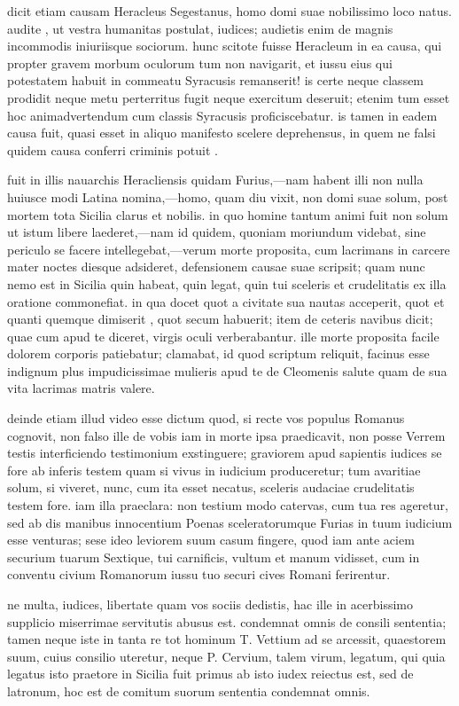  dicit etiam causam Heracleus Segestanus, homo domi suae nobilissimo loco natus. audite , ut vestra humanitas postulat, iudices; audietis enim de magnis incommodis iniuriisque sociorum. hunc scitote fuisse Heracleum in ea causa, qui propter gravem morbum oculorum tum non navigarit, et iussu eius qui potestatem habuit in commeatu Syracusis remanserit! is certe neque classem prodidit neque metu perterritus fugit neque exercitum deseruit; etenim tum esset hoc animadvertendum cum classis Syracusis proficiscebatur. is tamen in eadem causa fuit, quasi esset in aliquo manifesto scelere deprehensus, in quem ne falsi quidem causa conferri criminis potuit .

 fuit in illis nauarchis Heracliensis quidam Furius,—nam habent illi non nulla huiusce modi Latina nomina,—homo, quam diu vixit, non domi suae solum, post mortem tota Sicilia clarus et nobilis. in quo homine tantum animi fuit non solum ut istum libere laederet,—nam id quidem, quoniam moriundum videbat, sine periculo se facere intellegebat,—verum morte proposita, cum lacrimans in carcere mater noctes diesque adsideret, defensionem causae suae scripsit; quam nunc nemo est in Sicilia quin habeat, quin legat, quin tui sceleris et crudelitatis ex illa oratione commonefiat. in qua docet quot a civitate sua nautas acceperit, quot et quanti quemque dimiserit , quot secum habuerit; item de ceteris navibus dicit; quae cum apud te diceret, virgis oculi verberabantur. ille morte proposita facile dolorem corporis patiebatur; clamabat, id quod scriptum reliquit, facinus esse indignum plus impudicissimae mulieris apud te de Cleomenis salute quam de sua vita lacrimas matris valere.

 deinde etiam illud video esse dictum quod, si recte vos populus Romanus cognovit, non falso ille de vobis iam in morte ipsa praedicavit, non posse Verrem testis interficiendo testimonium exstinguere; graviorem apud sapientis iudices se fore ab inferis testem quam si vivus in iudicium produceretur; tum avaritiae solum, si viveret, nunc, cum ita esset necatus, sceleris audaciae crudelitatis testem fore. iam illa praeclara: non testium modo catervas, cum tua res ageretur, sed ab dis manibus innocentium Poenas sceleratorumque Furias in tuum iudicium esse venturas; sese ideo leviorem suum casum fingere, quod iam ante aciem securium tuarum Sextique, tui carnificis, vultum et manum vidisset, cum in conventu civium Romanorum iussu tuo securi cives Romani ferirentur.

 ne multa, iudices, libertate quam vos sociis dedistis, hac ille in acerbissimo supplicio miserrimae servitutis abusus est. condemnat omnis de consili sententia; tamen neque iste in tanta re tot hominum T. Vettium ad se arcessit, quaestorem suum, cuius consilio uteretur, neque P. Cervium, talem virum, legatum, qui quia legatus isto praetore in Sicilia fuit primus ab isto iudex reiectus est, sed de latronum, hoc est de comitum suorum sententia condemnat omnis.

